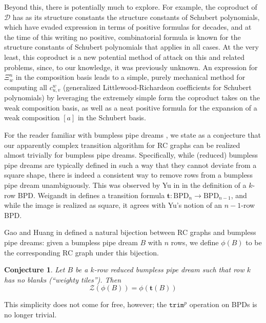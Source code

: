\documentclass{amsart}
\newtheorem{conjecture}[theorem]{Conjecture}
\theoremstyle{definition}
\theoremstyle{remark}
\numberwithin{equation}{subsection}
\newcommand{\trm}{\mathtt{trim}}
\newcommand{\zeromap}{\mathcal{Z}}
\newcommand{\dsch}{\ensuremath{\Xi}}
\newcommand{\dcoma}{\mathcal{D}}
\begin{document}
Beyond this, there is potentially much to explore. For example, the coproduct of $\dcoma$ has as its structure constants the structure constants of Schubert polynomials, which have evaded expression in terms of positive formulas for decades, and at the time of this writing no positive, combinatorial formula is known for the structure constants of Schubert polynomials that applies in all cases. At the very least, this coproduct is a new potential method of attack on this and related problems, since, to our knowledge, it was previously unknown. An expression for $\dsch_w^n$ in the composition basis leads to a simple, purely mechanical method for computing all $c_{u,v}^w$ (generalized Littlewood-Richardson coefficients for Schubert polynomials) by leveraging the extremely simple form the coproduct takes on the weak composition basis, as well as a neat positive formula for the expansion of a weak composition $[a]$ in the Schubert basis.

For the reader familiar with bumpless pipe dreams \cite{lam2021back}, we state as a conjecture that our apparently complex transition algorithm for RC graphs can be realized almost trivially for bumpless pipe dreams. Specifically, while (reduced) bumpless pipe dreams are typically defined in such a way that they cannot deviate from a square shape, there is indeed a consistent way to remove rows from a bumpless pipe dream unambiguously. This was observed by Yu in \cite[Lemma~3.18]{Yu2025EmbeddingBP} in the definition of a $k$-row BPD. Weigandt in \cite{Weigandt2021} defines a transition formula $\mathbf{t}:\mathrm{BPD}_n\to\mathrm{BPD}_{n-1}$, and while the image is realized as square, it agrees with Yu's notion of an $n-1$-row BPD.

Gao and Huang in \cite{GaoHuang2023} defined a natural bijection between RC graphs and bumpless pipe dreams: given a bumpless pipe dream $B$ with $n$ rows, we define $\phi(B)$ to be the corresponding RC graph under this bijection.
\begin{conjecture}
Let $B$ be a $k$-row reduced bumpless pipe dream such that row $k$ has no blanks (``weighty tiles''). Then 
$$\zeromap(\phi(B)) = \phi(\mathbf{t}(B))$$
\end{conjecture}

This simplicity does not come for free, however; the $\trm^p$ operation on BPDs is no longer trivial.
\end{document}
